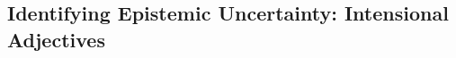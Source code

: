 \documentclass[10pt]{article}
\begin{document}
%
%
\subsection{Identifying Epistemic Uncertainty: Intensional Adjectives}
\end{document}
